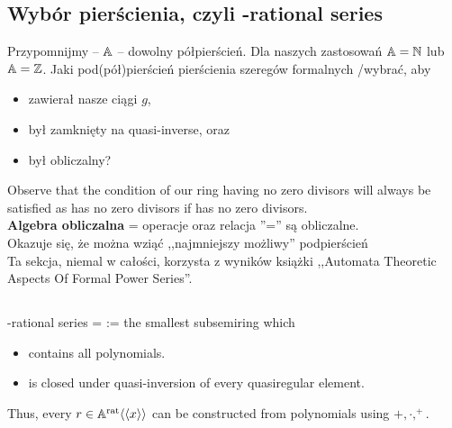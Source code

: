 \begin{df}
\section{Wybór pierścienia, czyli \Z-rational series}
Przypomnijmy -- $\mathbb{A}$ -- dowolny półpierścień. Dla naszych zastosowań $\mathbb{A} = \mathbb{N} $ lub $\mathbb{A} = \mathbb{Z}$. 
Jaki pod(pół)pierścień pierścienia szeregów formalnych \Zx/\Nx wybrać, aby 
\begin{itemize}
	\item zawierał nasze ciągi $g$,
	\item był zamknięty na quasi-inverse, oraz 
	\item był obliczalny? 
\end{itemize}
Observe that the condition of our ring having no zero divisors will always be satisfied as \Ax has no zero divisors if \A has no zero divisors.
\\
\textbf{Algebra obliczalna} = operacje oraz relacja ''='' są obliczalne.\\
Okazuje się, że można wziąć ,,najmniejszy możliwy'' podpierścień\\

Ta sekcja, niemal w całości, korzysta z wyników książki ,,Automata Theoretic Aspects Of Formal Power Series''. 

\subsection{}
\begin{df}
	\A-rational series = \Arat := the smallest subsemiring \Ax which
	\begin{itemize}
		\item contains all polynomials. 
		\item is closed under quasi-inversion of every quasiregular element.
	\end{itemize}
\end{df}
Thus, every $r\in \mathbb{ A }^{\text{rat}} \langle\langle x \rangle\rangle $ can be constructed from polynomials using $+, \cdot, ^+$. 


\end{df}
